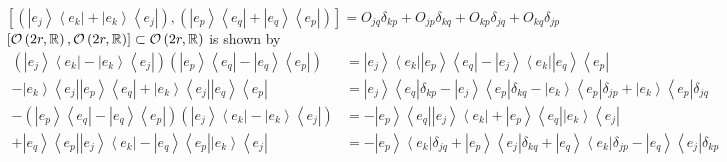 \documentclass[aps,preprint]{revtex4}
\begin{document}
\begin{equation}
\left[ \left( \left\vert e_{j}\right\rangle \left\langle e_{k}\right\vert
+\left\vert e_{k}\right\rangle \left\langle e_{j}\right\vert \right) ,\left(
\left\vert e_{p}\right\rangle \left\langle e_{q}\right\vert +\left\vert
e_{q}\right\rangle \left\langle e_{p}\right\vert \right) \right]
=O_{jq}\delta _{kp}+O_{jp}\delta _{kq}+O_{kp}\delta _{jq}+O_{kq}\delta _{jp}
\end{equation}%
$\left[ \mathcal{O}\left( 2r,\mathbb{R}\right) ,\mathcal{O}\left( 2r,\mathbb{%
R}\right) \right] \subset \mathcal{O}\left( 2r,\mathbb{R}\right) $ is shown
by 
\begin{align}
\left( \left\vert e_{j}\right\rangle \left\langle e_{k}\right\vert
-\left\vert e_{k}\right\rangle \left\langle e_{j}\right\vert \right) \left(
\left\vert e_{p}\right\rangle \left\langle e_{q}\right\vert -\left\vert
e_{q}\right\rangle \left\langle e_{p}\right\vert \right) & =\left\vert
e_{j}\right\rangle \left\langle e_{k}\right\vert \left\vert
e_{p}\right\rangle \left\langle e_{q}\right\vert -\left\vert
e_{j}\right\rangle \left\langle e_{k}\right\vert \left\vert
e_{q}\right\rangle \left\langle e_{p}\right\vert \\
-\left\vert e_{k}\right\rangle \left\langle e_{j}\right\vert \left\vert
e_{p}\right\rangle \left\langle e_{q}\right\vert +\left\vert
e_{k}\right\rangle \left\langle e_{j}\right\vert \left\vert
e_{q}\right\rangle \left\langle e_{p}\right\vert & =\left\vert
e_{j}\right\rangle \left\langle e_{q}\right\vert \delta _{kp}-\left\vert
e_{j}\right\rangle \left\langle e_{p}\right\vert \delta _{kq}-\left\vert
e_{k}\right\rangle \left\langle e_{p}\right\vert \delta _{jp}+\left\vert
e_{k}\right\rangle \left\langle e_{p}\right\vert \delta _{jq} \\
-\left( \left\vert e_{p}\right\rangle \left\langle e_{q}\right\vert
-\left\vert e_{q}\right\rangle \left\langle e_{p}\right\vert \right) \left(
\left\vert e_{j}\right\rangle \left\langle e_{k}\right\vert -\left\vert
e_{k}\right\rangle \left\langle e_{j}\right\vert \right) & =-\left\vert
e_{p}\right\rangle \left\langle e_{q}\right\vert \left\vert
e_{j}\right\rangle \left\langle e_{k}\right\vert +\left\vert
e_{p}\right\rangle \left\langle e_{q}\right\vert \left\vert
e_{k}\right\rangle \left\langle e_{j}\right\vert \\
+\left\vert e_{q}\right\rangle \left\langle e_{p}\right\vert \left\vert
e_{j}\right\rangle \left\langle e_{k}\right\vert -\left\vert
e_{q}\right\rangle \left\langle e_{p}\right\vert \left\vert
e_{k}\right\rangle \left\langle e_{j}\right\vert & =-\left\vert
e_{p}\right\rangle \left\langle e_{k}\right\vert \delta _{jq}+\left\vert
e_{p}\right\rangle \left\langle e_{j}\right\vert \delta _{kq}+\left\vert
e_{q}\right\rangle \left\langle e_{k}\right\vert \delta _{jp}-\left\vert
e_{q}\right\rangle \left\langle e_{j}\right\vert \delta _{kp}
\end{align}%
\end{document}
